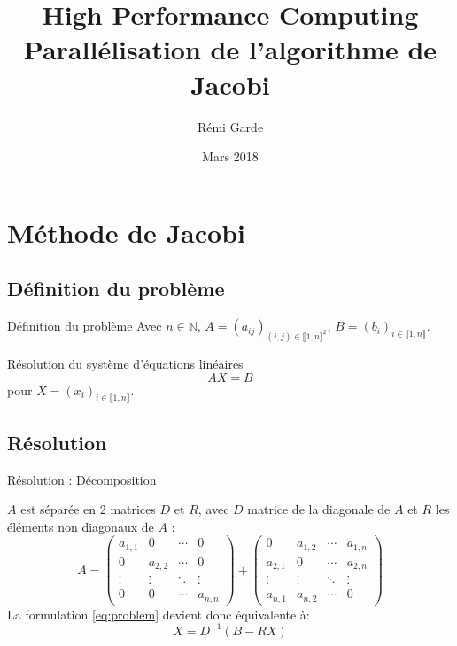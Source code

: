 \documentclass{beamer}
\title[Parallélisation de l'algorithme de Jacobi]{High Performance Computing \\
Parallélisation de l'algorithme de Jacobi}
\author{Rémi Garde}
\institute{}
\date{Mars 2018}
\begin{document}
\begin{frame}
  \titlepage
\end{frame}


\section{Méthode de Jacobi}

\subsection{Définition du problème}

\begin{frame}{Définition du problème}
Avec $n \in \mathds{N}$, $A = (a_{ij})_{(i,j)\in \llbracket 1,n \rrbracket^2}$, $B = (b_{i})_{i\in \llbracket 1,n \rrbracket}$.

Résolution du système d'équations linéaires
\begin{equation} \label{eq:problem}
    AX=B
\end{equation}
pour $X = (x_{i})_{i\in \llbracket 1,n \rrbracket}$.
\end{frame}

\subsection{Résolution}

\begin{frame}{Résolution : Décomposition}

$A$ est séparée en 2 matrices $D$ et $R$, avec $D$ matrice de la diagonale de $A$ et $R$ les éléments non diagonaux de $A$ :
\[
A =
  \begin{pmatrix}
  a_{1,1} & 0 & \cdots & 0 \\
  0 & a_{2,2} & \cdots & 0 \\
  \vdots  & \vdots  & \ddots & \vdots  \\
  0 & 0 & \cdots & a_{n,n}
 \end{pmatrix}
 +
  \begin{pmatrix}
  0 & a_{1,2} & \cdots & a_{1,n} \\
  a_{2,1} & 0 & \cdots & a_{2,n} \\
  \vdots  & \vdots  & \ddots & \vdots  \\
  a_{n,1} & a_{n,2} & \cdots & 0
 \end{pmatrix}
\]
La formulation \eqref{eq:problem} devient donc équivalente à:
\begin{equation} \label{eq:reeq}
    X = D^{-1} (B-RX)
\end{equation}
\end{frame}
\end{document}
